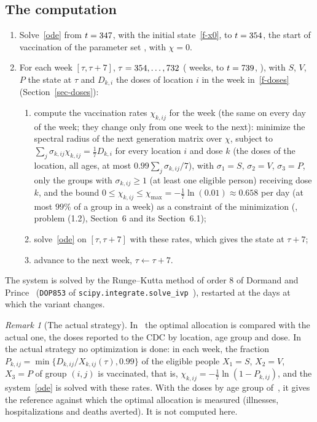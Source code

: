 \documentclass[11pt]{article}
\theoremstyle{remark}
\newtheorem{remark}[lemma]{Remark}
\newcommand{\src}[1]{\path{#1}}
\newcommand{\fref}[1]{\ref{#1}}
\begin{document}
\subsection{The computation}\label{sec-comp}

\begin{enumerate}[leftmargin=*]
\item Solve~\eqref{ode} from $t=347$, with the initial state~\fref{f-x0}, to
$t=354$, the start of vaccination of the parameter set \texttt{\RunParams}, with $\chi=0$.
\item For each week $[\tau,\tau+7]$, $\tau=354,\dots,732$ (\RunWeeks{} weeks, to
$t=739$, \RunTendDate), with
$S$, $V$, $P$ the state at $\tau$ and $D_{k,i}$ the doses of location $i$ in the
week in~\fref{f-doses} (Section~\ref{sec-doses}):
\begin{enumerate}[label=(\alph*)]
\item compute the vaccination rates $\chi_{k,ij}$ for the week (the same on every
day of the week; they change only from one week to the next): minimize the
spectral radius of the next generation matrix over $\chi$, subject to
$\sum_j\sigma_{k,ij}\chi_{k,ij}=\frac17D_{k,i}$ for every location $i$ and
dose $k$ (the doses of the location, all ages, at most $0.99\sum_j\sigma_{k,ij}/7$),
with $\sigma_1=S$, $\sigma_2=V$, $\sigma_3=P$, only the groups with
$\sigma_{k,ij}\ge1$ (at least one eligible person) receiving dose $k$, and the bound
$0\le\chi_{k,ij}\le\chi_{\max}=-\frac17\ln(0.01)\approx0.658$ per day (at most $99\%$
of a group in a week) as a constraint of the minimization
(\src{stratified_seir_ngm.tex}, problem (1.2), Section~6 and its Section~6.1);
\item solve~\eqref{ode} on $[\tau,\tau+7]$ with these rates, which gives the state
at $\tau+7$;
\item advance to the next week, $\tau\leftarrow\tau+7$.
\end{enumerate}
\end{enumerate}
The system is solved by the Runge--Kutta method of order 8 of Dormand and
Prince~\cite{1980Dormand_Prince} (\texttt{DOP853} of
\texttt{scipy.integrate.solve\_ivp}~\cite{2020Virtanen_scipy}), restarted at the
days at which the variant changes.

\begin{remark}[The actual strategy]\label{rem-actual}
In~\cite{2026Feng_Day_Glasser} the optimal allocation is compared with the
actual one, the doses reported to the CDC by location, age group and dose. In
the actual strategy no optimization is done: in each week, the fraction
$P_{k,ij}=\min\{D_{k,ij}/X_{k,ij}(\tau),0.99\}$ of the eligible people
$X_1=S$, $X_2=V$, $X_3=P$ of group $(i,j)$ is vaccinated, that is,
$\chi_{k,ij}=-\frac17\ln\left(1-P_{k,ij}\right)$, and the system~\eqref{ode} is
solved with these rates. With the doses by age group
of~\cite[Section~2.2]{2026Feng_Day_Glasser}, it gives the reference against which
the optimal allocation is measured (illnesses, hospitalizations and deaths
averted). It is not computed here. 
\end{remark}
\end{document}
